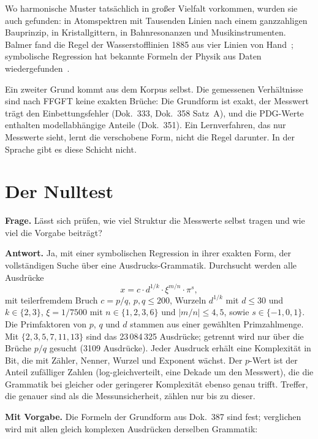 Wo harmonische Muster tatsächlich in großer Vielfalt vorkommen, wurden sie auch gefunden: in
Atomspektren mit Tausenden Linien nach einem ganzzahligen Bauprinzip, in Kristallgittern, in
Bahnresonanzen und Musikinstrumenten. Balmer fand die Regel der Wasserstofflinien 1885 aus vier
Linien von Hand \QM\,\cite{Balmer1885}; symbolische Regression hat bekannte Formeln der Physik aus
Daten wiedergefunden \QM\,\cite{Udrescu2020}.

Ein zweiter Grund kommt aus dem Korpus selbst. Die gemessenen Verhältnisse sind nach FFGFT keine
exakten Brüche: Die Grundform ist exakt, der Messwert trägt den Einbettungsfehler (Dok.~333, Dok.~358
Satz~A), und die PDG-Werte enthalten modellabhängige Anteile (Dok.~351). Ein Lernverfahren, das nur
Messwerte sieht, lernt die verschobene Form, nicht die Regel darunter. In der Sprache gibt es diese
Schicht nicht.

\section{Der Nulltest}
\label{sec:nulltest}

\textbf{Frage.} Lässt sich prüfen, wie viel Struktur die Messwerte selbst tragen und wie viel die
Vorgabe beiträgt?

\textbf{Antwort.} Ja, mit einer symbolischen Regression in ihrer exakten Form, der vollständigen
Suche über eine Ausdrucks-Grammatik. Durchsucht werden alle Ausdrücke
\[
  x=c\cdot d^{1/k}\cdot\xi^{m/n}\cdot\pi^{s},
\]
mit teilerfremdem Bruch $c=p/q$, $p,q\le200$, Wurzeln $d^{1/k}$ mit $d\le30$ und $k\in\{2,3\}$,
$\xi=1/7500$ mit $n\in\{1,2,3,6\}$ und $|m/n|\le4{,}5$, sowie $s\in\{-1,0,1\}$. Die Primfaktoren von
$p$, $q$ und $d$ stammen aus einer gewählten Primzahlmenge. Mit $\{2,3,5,7,11,13\}$ sind das
23\,084\,325 Ausdrücke; getrennt wird nur über die Brüche $p/q$ gesucht (3109 Ausdrücke). Jeder
Ausdruck erhält eine Komplexität in Bit, die mit Zähler, Nenner, Wurzel und Exponent wächst. Der
$p$-Wert ist der Anteil zufälliger Zahlen (log-gleichverteilt, eine Dekade um den Messwert), die die
Grammatik bei gleicher oder geringerer Komplexität ebenso genau trifft. Treffer, die genauer sind als
die Messunsicherheit, zählen nur bis zu dieser.

\textbf{Mit Vorgabe.} Die Formeln der Grundform aus Dok.~387 sind fest; verglichen wird mit allen
gleich komplexen Ausdrücken derselben Grammatik:

